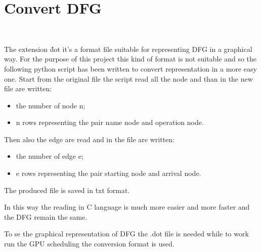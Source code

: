 \chapter{Convert DFG}\
\label{appendix1}

The extension \.dot it's a format file suitable for 
representing DFG in a graphical way. For the purpose of
this project this kind of format is not suitable and so     
the following python script has been written to convert 
representation in a more easy one. Start from the original file
the script read all the node and than in the new file are written:

\begin{itemize}
    \item the number of node n;
    \item n rows representing the pair name node and operation node.
\end{itemize}

Then also the edge are read and in the file are written:

\begin{itemize}
    \item the number of edge e;
    \item e rows representing the pair starting node and arrival node.
\end{itemize}

The produced file is saved in \.txt format.

In this way the reading in C language is much more easier and more faster and the DFG remain the same.

To se the graphical representation of DFG the .dot file is needed while to work run the GPU scheduling 
the conversion format is used.
